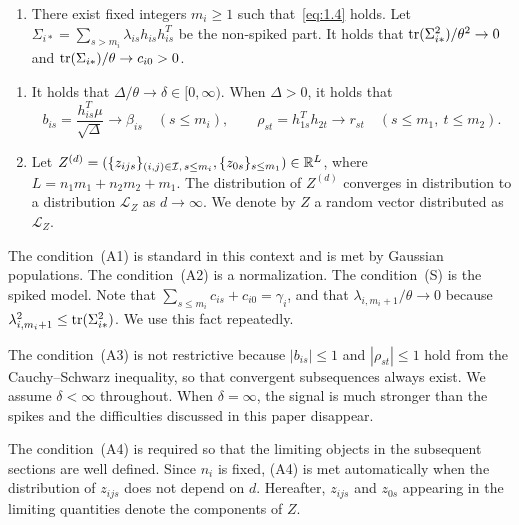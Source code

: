 \begin{enumerate}[label=(S),leftmargin=*]
\item There exist fixed integers $m_i\ge 1$ such that~\eqref{eq:1.4} holds. Let
$\Sigma_{i*}=\sum_{s>m_i}\lambda_{is}h_{is}h_{is}^T$ be the non-spiked part. It
holds that $\operatorname{tr}(\Sigma_{i*}^2)/\theta^2\to 0$ and
$\operatorname{tr}(\Sigma_{i*})/\theta\to c_{i0}>0$.
\end{enumerate}

\begin{enumerate}[label=(A\arabic*),leftmargin=*,start=3]
\item It holds that $\Delta/\theta\to\delta\in[0,\infty)$. When $\Delta>0$, it
holds that
\[
b_{is}=\frac{h_{is}^T\mu}{\sqrt{\Delta}}\to\beta_{is}\quad(s\le m_i),
\qquad
\rho_{st}=h_{1s}^T h_{2t}\to r_{st}\quad(s\le m_1,\ t\le m_2).
\]

\item Let
$Z^{(d)}=(\{z_{ijs}\}_{(i,j)\in\mathcal{I},\,s\le m_i},\{z_{0s}\}_{s\le m_1})\in\mathbb{R}^L$,
where $L=n_1 m_1+n_2 m_2+m_1$. The distribution of $Z^{(d)}$ converges in
distribution to a distribution $\mathcal{L}_Z$ as $d\to\infty$. We denote by $Z$ a
random vector distributed as $\mathcal{L}_Z$.
\end{enumerate}

The condition~(A1) is standard in this context and is met by Gaussian populations.
The condition~(A2) is a normalization. The condition~(S) is the spiked model. Note
that $\sum_{s\le m_i}c_{is}+c_{i0}=\gamma_i$, and that
$\lambda_{i,m_i+1}/\theta\to 0$ because $\lambda_{i,m_i+1}^2\le\operatorname{tr}(\Sigma_{i*}^2)$.
We use this fact repeatedly.

The condition~(A3) is not restrictive because $|b_{is}|\le 1$ and $|\rho_{st}|\le 1$
hold from the Cauchy--Schwarz inequality, so that convergent subsequences always
exist. We assume $\delta<\infty$ throughout. When $\delta=\infty$, the signal is
much stronger than the spikes and the difficulties discussed in this paper
disappear.

The condition~(A4) is required so that the limiting objects in the subsequent
sections are well defined. Since $n_i$ is fixed, (A4) is met automatically when the
distribution of $z_{ijs}$ does not depend on $d$. Hereafter, $z_{ijs}$ and $z_{0s}$
appearing in the limiting quantities denote the components of $Z$.
